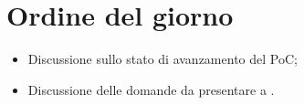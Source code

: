 \section{Ordine del giorno}
\begin{itemize}
\item Discussione sullo stato di avanzamento del PoC;
\item Discussione delle domande da presentare a \Proponente.
\end{itemize}